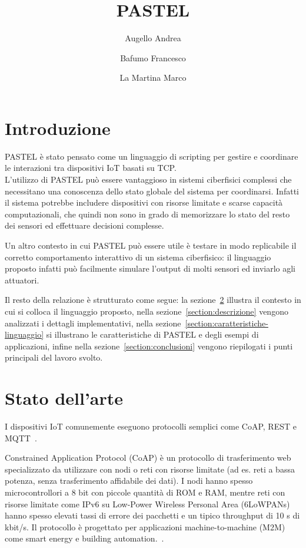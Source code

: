 \documentclass[10pt]{article}
\title{PASTEL}
\author{{Augello Andrea} \and {Bafumo Francesco} \and{La Martina Marco}}
\begin{document}
\maketitle
\tableofcontents
\clearpage



\section{Introduzione}
PASTEL è stato pensato come un linguaggio di scripting per gestire e coordinare le interazioni tra dispositivi IoT basati su TCP.\\
L'utilizzo di PASTEL può essere vantaggioso in sistemi ciberfisici complessi che necessitano una conoscenza dello stato globale del sistema per coordinarsi. Infatti il sistema potrebbe includere dispositivi con risorse limitate e scarse capacità computazionali, che quindi non sono in grado di memorizzare lo stato del resto dei sensori ed effettuare decisioni complesse. 

Un altro contesto in cui PASTEL può essere utile è testare in modo replicabile il corretto comportamento interattivo di un sistema ciberfisico: il linguaggio proposto infatti può facilmente simulare l'output di molti sensori ed inviarlo agli attuatori.

Il resto della relazione è strutturato come segue: la sezione~\ref{section:stato-arte} illustra il contesto in cui si colloca il linguaggio proposto, nella sezione~\ref{section:descrizione} vengono analizzati i dettagli implementativi, nella sezione~\ref{section:caratteristiche-linguaggio} si illustrano le caratteristiche di PASTEL e degli esempi di applicazioni, infine nella sezione~\ref{section:conclusioni} vengono riepilogati i punti principali del lavoro svolto.



\section{Stato dell'arte}\label{section:stato-arte}

I dispositivi IoT comunemente eseguono protocolli semplici come CoAP, REST e MQTT~\cite{tandale2017empirical}. 

Constrained Application Protocol (CoAP) è un   protocollo di trasferimento web specializzato da utilizzare con nodi o reti con risorse limitate (ad es. reti a bassa potenza, senza trasferimento affidabile dei dati). I nodi hanno spesso microcontrollori  a 8 bit con piccole quantità di ROM e RAM, mentre reti con risorse limitate come IPv6 su Low-Power Wireless Personal Area  (6LoWPANs) hanno spesso elevati tassi di errore dei pacchetti e un tipico throughput di 10 s di kbit/s. Il protocollo è progettato per applicazioni  machine-to-machine (M2M) come smart energy e building automation.~\cite{shelby2014constrained}.
\end{document}
